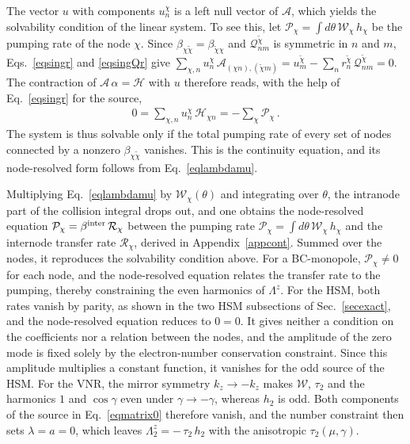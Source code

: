\documentclass[aps,prb,onecolumn,nofootinbib,citeautoscript,10pt]{revtex4-2}
\begin{document}
The vector $u$ with components $u^\chi_n$ is a left null vector of $\mathcal A$, which yields the solvability condition of the linear system. To see this, let $\mathcal P_\chi=\int d\theta\,\mathcal W_\chi\,h_\chi$ be the pumping rate of the node $\chi$. Since $\beta_{\chi\tilde\chi}=\beta_{\tilde\chi\chi}$ and $\mathcal Q^{\tilde\chi}_{nm}$ is symmetric in $n$ and $m$, Eqs.~\eqref{eqsingr} and \eqref{eqsingQr} give $\sum_{\chi,n}u^\chi_n\,\mathcal A_{(\chi n),(\tilde\chi m)}=u^{\tilde\chi}_m-\sum_n r^{\tilde\chi}_n\,\mathcal Q^{\tilde\chi}_{nm}=0$. The contraction of $\mathcal A\,\alpha=\mathcal H$ with $u$ therefore reads, with the help of Eq.~\eqref{eqsingr} for the source,
\begin{align}
0=\sum_{\chi,n}u^\chi_n\,\mathcal H_{\chi n}=-\sum_\chi\mathcal P_\chi\,.
\end{align}
The system is thus solvable only if the total pumping rate of every set of nodes connected by a nonzero $\beta_{\chi\tilde\chi}$ vanishes. This is the continuity equation, and its node-resolved form follows from Eq.~\eqref{eqlambdamu}.

Multiplying Eq.~\eqref{eqlambdamu} by $\mathcal W_\chi(\theta)$ and integrating over $\theta$, the intranode part of the collision integral drops out, and one obtains the node-resolved equation $\mathcal P_\chi=\beta^{\rm inter}\,\mathcal R_\chi$ between the pumping rate $\mathcal P_\chi=\int d\theta\,\mathcal W_\chi\,h_\chi$ and the internode transfer rate $\mathcal R_\chi$, derived in Appendix~\ref{appcont}. Summed over the nodes, it reproduces the solvability condition above. For a BC-monopole, $\mathcal P_\chi\neq0$ for each node, and the node-resolved equation relates the transfer rate to the pumping, thereby constraining the even harmonics of $\Lambda^z$. For the HSM, both rates vanish by parity, as shown in the two HSM subsections of Sec.~\ref{secexact}, and the node-resolved equation reduces to $0=0$. It gives neither a condition on the coefficients nor a relation between the nodes, and the amplitude of the zero mode is fixed solely by the electron-number conservation constraint. Since this amplitude multiplies a constant function, it vanishes for the odd source of the HSM. For the VNR, the mirror symmetry $k_z\to-k_z$ makes $\mathcal W$, $\tau_2$ and the harmonics $1$ and $\cos\gamma$ even under $\gamma\to-\gamma$, whereas $h_2$ is odd. Both components of the source in Eq.~\eqref{eqmatrix0} therefore vanish, and the number constraint then sets $\lambda=a=0$, which leaves $\Lambda^z_2=-\,\tau_2\,h_2$ with the anisotropic $\tau_2(\mu,\gamma)$.
\end{document}
